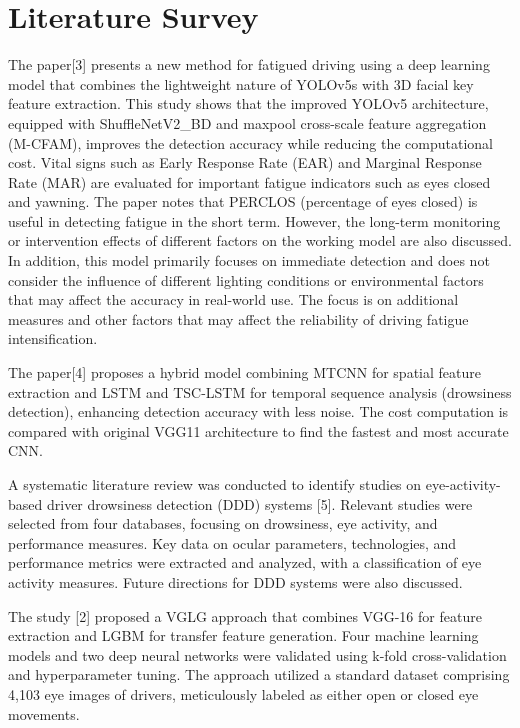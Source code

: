 \documentclass[a4paper,12pt]{report}
\begin{document}
\onehalfspacing

\chapter{Literature Survey}

The paper[3] presents a new method for fatigued driving using a deep learning model that combines the lightweight nature of YOLOv5s with 3D facial key feature extraction. This study shows that the improved YOLOv5 architecture, equipped with ShuffleNetV2\_BD and maxpool cross-scale feature aggregation (M-CFAM), improves the detection accuracy while reducing the computational cost. Vital signs such as Early Response Rate (EAR) and Marginal Response Rate (MAR) are evaluated for important fatigue indicators such as eyes closed and yawning.
The paper notes that PERCLOS (percentage of eyes closed) is useful in detecting fatigue in the short term. However, the long-term monitoring or intervention effects of different factors on the working model are also discussed.
In addition, this model primarily focuses on immediate detection and does not consider the influence of different lighting conditions or environmental factors that may affect the accuracy in real-world use. The focus is on additional measures and other factors that may affect the reliability of driving fatigue intensification.

The paper[4] proposes a hybrid model combining MTCNN for spatial feature extraction and LSTM and TSC-LSTM for temporal sequence analysis (drowsiness detection), enhancing detection accuracy with less noise. The cost computation is compared with original VGG11 architecture to find the fastest and most accurate CNN.

A systematic literature review was conducted to identify studies on eye-activity-based driver drowsiness detection (DDD) systems [5]. Relevant studies were selected from four databases, focusing on drowsiness, eye activity, and performance measures. Key data on ocular parameters, technologies, and performance metrics were extracted and analyzed, with a classification of eye activity measures. Future directions for DDD systems were also discussed.

The study [2] proposed a VGLG approach that combines VGG-16 for feature extraction and LGBM for transfer feature generation. Four machine learning models and two deep neural networks were validated using k-fold cross-validation and hyperparameter tuning. The approach utilized a standard dataset comprising 4,103 eye images of drivers, meticulously labeled as either open or closed eye movements.
\end{document}
